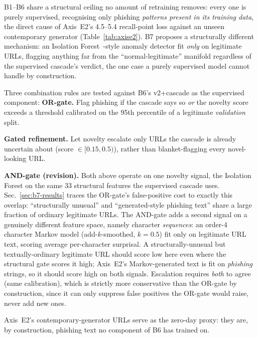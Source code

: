\documentclass[conference]{IEEEtran}
\begin{document}
B1--B6 share a structural ceiling no amount of retraining removes: every
one is purely supervised, recognising only phishing \emph{patterns present in its training data},
the direct cause of Axis~E2's 4.5--5.4
recall-point loss against an unseen contemporary generator
(Table~\ref{tab:axise2}). B7 proposes a structurally different mechanism:
an Isolation Forest~\cite{liu2008isolation}-style anomaly detector fit
\emph{only} on legitimate URLs, flagging anything far from the
``normal-legitimate'' manifold regardless of the supervised cascade's verdict, the one case a purely
supervised model cannot handle by construction.

Three combination rules are tested against B6's v2+cascade as the
supervised component:
\smallskip\noindent\textbf{OR-gate.} Flag phishing if the cascade says so
\emph{or} the novelty score exceeds a threshold calibrated on the 95th
percentile of a legitimate \emph{validation} split.

\smallskip\noindent\textbf{Gated refinement.} Let novelty escalate only
URLs the cascade is already uncertain about (score $\in [0.15, 0.5)$),
rather than blanket-flagging every novel-looking URL.

\smallskip\noindent\textbf{AND-gate (revision).} Both above operate on one novelty signal, the Isolation Forest on the same
33 structural features the supervised cascade uses. Sec.~\ref{sec:b7-results} traces
the OR-gate's false-positive cost to exactly this overlap: ``structurally
unusual'' and ``generated-style phishing text'' share a large fraction of
ordinary legitimate URLs. The AND-gate adds a second signal on a genuinely different feature space, namely
character \emph{sequences}: an
order-4 character Markov model (add-$k$-smoothed, $k=0.5$) fit only on
legitimate URL text, scoring average per-character surprisal. A
structurally-unusual but textually-ordinary legitimate URL should score
low here even where the structural gate scores it high; Axis~E2's
Markov-generated text is fit on \emph{phishing} strings, so it should
score high on both signals. Escalation requires \emph{both} to agree (same calibration), which is
strictly more conservative than the OR-gate by construction, since it can only suppress false positives the OR-gate
would raise, never add new ones.
\smallskip

Axis~E2's contemporary-generator URLs serve as the zero-day proxy: they
are, by construction, phishing text no component of B6 has trained on.

\end{document}
